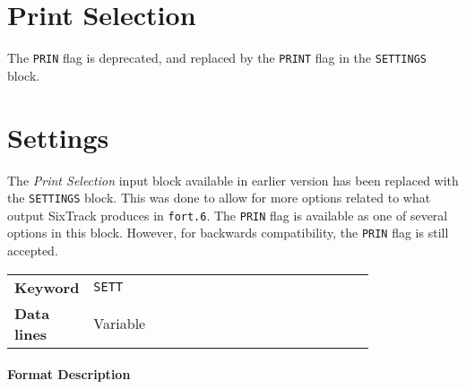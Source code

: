 \section{Print Selection} \label{PriSel}

The \texttt{PRIN} flag is deprecated, and replaced by the \texttt{PRINT} flag in the \texttt{SETTINGS} block.

\section{Settings} \label{STSett}

The \textit{Print Selection} input block available in earlier version has been replaced with the \texttt{SETTINGS} block.
This was done to allow for more options related to what output SixTrack produces in \texttt{fort.6}.
The \texttt{PRIN} flag is available as one of several options in this block.
However, for backwards compatibility, the \texttt{PRIN} flag is still accepted.

\bigskip
\begin{tabular}{@{}lp{0.8\linewidth}}
    \textbf{Keyword}    & \texttt{SETT} \\
    \textbf{Data lines} & Variable
\end{tabular}

\paragraph{Format Description}~


